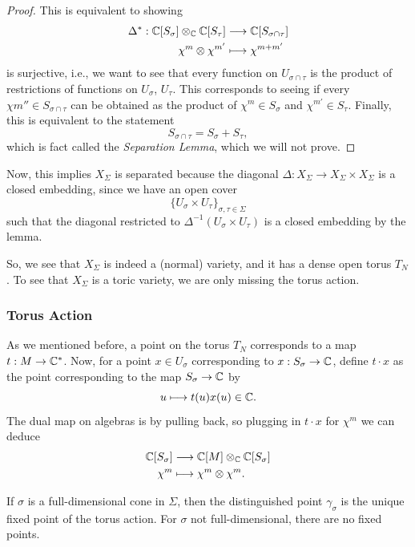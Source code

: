\documentclass[12pt]{article}
\begin{document}
\begin{proof}
    This is equivalent to showing
    \begin{align*}
        \Delta^*: \mathbb{C}[S_\sigma] \otimes_{\mathbb{C}} \mathbb{C}[S_\tau] &\longrightarrow \mathbb{C}[S_{\sigma\cap \tau}]\\
        \chi^m \otimes \chi^{m'} &\longmapsto \chi^{m+m'} 
    \end{align*}
    is surjective, i.e., we want to see that every function on $U_{\sigma\cap \tau}$ is the product of restrictions of functions on $U_\sigma$, $U_\tau$. This corresponds to seeing if every $\chi{m''}\in S_{\sigma\cap \tau}$ can be obtained as the product of $\chi^m\in S_\sigma$ and $\chi^{m'}\in S_\tau$. Finally, this is equivalent to the statement
    \[S_{\sigma \cap \tau} = S_\sigma + S_\tau,\]
    which is fact called the \textit{Separation Lemma}, which we will not prove.
\end{proof}

Now, this implies $X_\Sigma$ is separated because the diagonal $\Delta: X_\Sigma \to X_\Sigma \times X_\Sigma$ is a closed embedding, since we have an open cover
\[\{U_\sigma \times U_\tau\}_{\sigma,\tau \in \Sigma}\]
such that the diagonal restricted to $\Delta^{-1}(U_\sigma\times U_\tau)$ is a closed embedding by the lemma.

So, we see that $X_\Sigma$ is indeed a (normal) variety, and it has a dense open torus $T_N$. To see that $X_\Sigma$ is a toric variety, we are only missing the torus action.

\subsubsection{Torus Action}

As we mentioned before, a point on the torus $T_N$ corresponds to a map $t:M\to \mathbb{C}^*$. Now, for a point $x\in U_\sigma$ corresponding to $x: S_\sigma\to \mathbb{C}$, define $t\cdot x$ as the point corresponding to the map $S_\sigma \to \mathbb{C}$ by
\[u \longmapsto t(u)x(u) \in \mathbb{C}.\]
The dual map on algebras is by pulling back, so plugging in $t\cdot x$ for $\chi^m$ we can deduce
\begin{align*}
    \mathbb{C}[S_\sigma] &\longrightarrow \mathbb{C}[M]\otimes_{\mathbb{C}} \mathbb{C}[S_\sigma]\\
    \chi^m &\longmapsto \chi^m \otimes \chi^m.
\end{align*}

\begin{prop}\label{prop:fixed_pt}
    If $\sigma$ is a full-dimensional cone in $\Sigma$, then the distinguished point $\gamma_\sigma$ is the unique fixed point of the torus action. For $\sigma$ not full-dimensional, there are no fixed points.
\end{prop}
\end{document}
